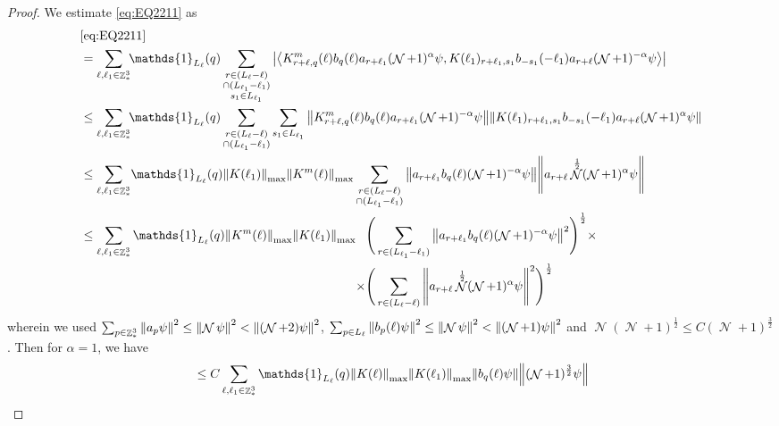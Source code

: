 \documentclass[sn-mathphys, Numbered ,a4paper]{sn-jnl}%
\DeclareMathOperator{\Z}{\mathbb{Z}}
\DeclareMathOperator{\NN}{\mathcal{N}}
\newcommand{\half}{\frac{1}{2}}
\newcommand{\eva}[1]{\left\langle #1 \right\rangle}
\theoremstyle{plain}
\theoremstyle{definition}
\theoremstyle{remark}
\theoremstyle{plain}
\theoremstyle{definition}
\theoremstyle{remark}
\begin{document}
\begin{proof}
 We estimate \eqref{eq:EQ2211} as
 \begin{alignat}{2}
 	&\eqref{eq:EQ2211}\nonumber\\
 	&= \sum\limits_{\ell,\ell_1 \in \Z^3_*}\!\! \mathds{1}_{L_\ell}(q) \sum\limits_{\substack{r\in (L_{\ell}-\ell)\\ \cap (L_{\ell_1}-\ell_1)\\ s_1 \in L_{\ell_1}}} \abs{\eva{ K^{m}_{r+\ell,q}(\ell) b_{q}(\ell) a_{r+\ell_1} (\NN+1)^{\alpha}  \psi, K(\ell_1)_{r+\ell_1,s_1} b_{-s_1}(-\ell_1) a_{r+\ell} (\NN+1)^{-\alpha} \psi }}\nonumber\\
 	&\leq \sum\limits_{\ell,\ell_1 \in \Z^3_*} \!\!\mathds{1}_{L_\ell}(q) \sum\limits_{\substack{r\in (L_{\ell}-\ell)\\ \cap (L_{\ell_1}-\ell_1)}}  \sum\limits_{s_1 \in L_{\ell_1}}  \norm{ K^{m}_{r+\ell,q}(\ell) b_{q}(\ell) a_{r+\ell_1} (\NN+1)^{-\alpha}\psi}\norm{  K(\ell_1)_{r+\ell_1,s_1} b_{-s_1}(-\ell_1) a_{r+\ell} (\NN+1)^{\alpha}\psi } \nonumber\\
 	&\leq \sum\limits_{\ell,\ell_1 \in \Z^3_*} \!\mathds{1}_{L_\ell}(q) \norm{K(\ell_1)}_{\mathrm{max}} \norm{K^m(\ell)}_{\mathrm{max}} \sum\limits_{\substack{r \in (L_\ell-\ell) \\ \cap (L_{\ell_1}-\ell_1)}} \norm{a_{r+\ell_1} b_{q}(\ell) (\NN+1)^{-\alpha} \psi} \norm { a_{r+\ell} \NN^\half (\NN+1)^{\alpha} \psi }\nonumber\\
 	&\leq \sum\limits_{\ell,\ell_1 \in \Z^3_*} \mathds{1}_{L_\ell}(q) \norm{K^{m}(\ell)}_{\mathrm{max}}\norm{K(\ell_1)}_{\mathrm{max}} \begin{aligned}[t]
 		&\Bigg(\sum\limits_{r \in (L_{\ell_1}-\ell_1)} \norm{ a_{r+\ell_1} b_{q}(\ell) (\NN+1)^{-\alpha} \psi}^2\Bigg)^\half\times \nonumber\\\times &\Bigg( \sum\limits_{r \in (L_\ell-\ell)} \norm { a_{r+\ell}  \NN^\half (\NN+1)^{\alpha} \psi }^2\Bigg)^\half \end{aligned}\nonumber
 \end{alignat}
 wherein we used $\sum_{p\in \Z^3_*}\norm{a_p \psi}^2\leq\norm{\NN\psi}^2<\norm{(\NN+2)\psi}^2$, $\sum_{p\in L_{\ell}}\norm{b_p(\ell) \psi}^2\leq\norm{\NN\psi}^2<\norm{(\NN+1)\psi}^2$ and $\NN (\NN+1)^\half\leq C(\NN+1)^{\frac{3}{2}}$. Then for $\alpha = 1$, we have
 \begin{align}
 	&\leq C\sum\limits_{\ell,\ell_1 \in \Z^3_*} \mathds{1}_{L_\ell}(q) \norm{K(\ell)}_{\mathrm{max}}\norm{K(\ell_1)}_{\mathrm{max}}  \norm{b_{q}(\ell) \psi} \norm { (\NN+1)^{\frac{3}{2}} \psi }\nonumber\\

\end{align}
\end{proof}
\end{document}
